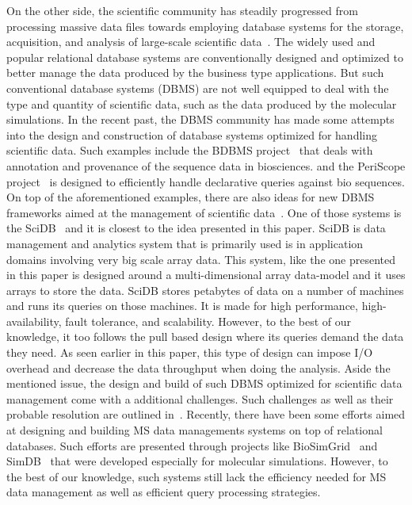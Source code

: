 \documentclass[10pt,journal,final,letterpaper,twocolumn]{IEEEtran}
\begin{document}
On the other side, the scientific community has steadily progressed
from processing massive data files towards employing database
systems for the storage, acquisition, and analysis of large-scale
scientific data~\cite{SDSS_SIGMOD02,QBISM_ICDE94}. The widely used
and popular relational database systems are conventionally designed
and optimized to better manage the data produced by the business
type applications. But such conventional database systems (DBMS) are
not well equipped to deal with the type and quantity of scientific
data, such as the data produced by the molecular simulations. In the
recent past, the DBMS community has made some attempts into the
design and construction of database systems optimized for handling
scientific data. Such examples include the BDBMS
project~\cite{BDBMS_CIDR07} that deals with annotation and
provenance of the sequence data in biosciences. and the PeriScope
project~\cite{PeriScope} is designed to efficiently handle
declarative queries against bio sequences. On top of the
aforementioned examples, there are also ideas for new DBMS
frameworks aimed at the management of scientific
data~\cite{NewArch-VLDB07,ROI-CIDR07,SciDB-SIGMOD10}. One of those
systems is the SciDB~\cite{SciDB-SIGMOD10,SciDB} and it is closest
to the idea presented in this paper. SciDB is data management and
analytics system that is primarily used is in application domains
involving very big scale array data. This system, like the one
presented in this paper is designed around a multi-dimensional array
data-model and it uses arrays to store the data. SciDB stores
petabytes of data on a number of machines and runs its queries on
those machines. It is made for high performance, high-availability,
fault tolerance, and scalability. However, to the best of our
knowledge, it too follows the pull based design where its queries
demand the data they need. As seen earlier in this paper, this type
of design can impose I/O overhead and decrease the data throughput
when doing the analysis. Aside the mentioned issue, the design and
build of such DBMS optimized for scientific data management come
with a additional challenges. Such challenges as well as their
probable resolution are outlined in~\cite{Sci_SIGMODR05}. Recently,
there have been some efforts aimed at designing and building MS data
managements systems on top of relational databases. Such efforts are
presented through projects like BioSimGrid~\cite{BioSimGrid} and
SimDB~\cite{SimDB} that were developed especially for molecular
simulations. However, to the best of our knowledge, such systems
still lack the efficiency needed for MS data management as well as
efficient query processing strategies.
\end{document}

